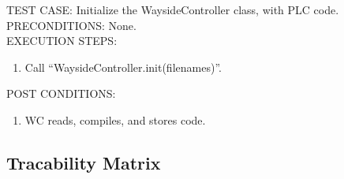 \documentclass{scrreprt}
\begin{document}
        TEST CASE: Initialize the WaysideController class, with PLC code.\\
        PRECONDITIONS: None.\\
        EXECUTION STEPS: \begin{enumerate}
            \item Call ``WaysideController.init(filenames)''.
        \end{enumerate}
        POST CONDITIONS: \begin{enumerate}
            \item WC reads, compiles, and stores code.
        \end{enumerate}

    \subsection{Tracability Matrix}
\end{document}
